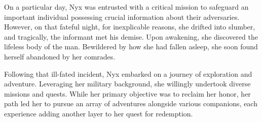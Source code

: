 \documentclass{article}
\begin{document}
On a particular day, Nyx was entrusted with a critical mission to safeguard an important individual possessing crucial information about their adversaries.
However, on that fateful night, for inexplicable reasons, she drifted into slumber, and tragically, the informant met his demise. Upon awakening, she
discovered the lifeless body of the man. Bewildered by how she had fallen asleep, she soon found herself abandoned by her comrades.

Following that ill-fated incident, Nyx embarked on a journey of exploration and adventure. Leveraging her military background, she willingly undertook diverse
missions and quests. While her primary objective was to reclaim her honor, her path led her to pursue an array of adventures alongside various companions, each
experience adding another layer to her quest for redemption.
\end{document}

